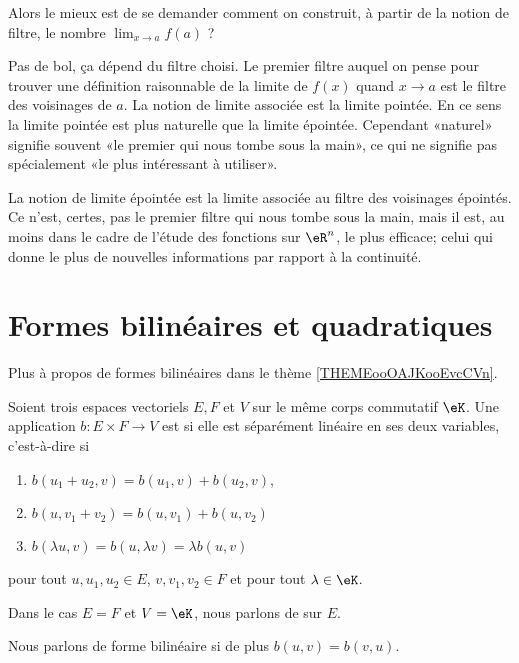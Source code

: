 Alors le mieux est de se demander comment on construit, à partir de la notion de filtre, le nombre \( \lim_{x\to a} f(a)\) ?

Pas de bol, ça dépend du filtre choisi. Le premier filtre auquel on pense pour trouver une définition raisonnable de la limite de \( f(x)\) quand \( x\to a\) est le filtre des voisinages de \( a\). La notion de limite associée est la limite pointée. En ce sens la limite pointée est plus naturelle que la limite épointée. Cependant «naturel» signifie souvent «le premier qui nous tombe sous la main», ce qui ne signifie pas spécialement «le plus intéressant à utiliser».

La notion de limite épointée est la limite associée au filtre des voisinages épointés. Ce n'est, certes, pas le premier filtre qui nous tombe sous la main, mais il est, au moins dans le cadre de l'étude des fonctions sur \( \eR^n\), le plus efficace; celui qui donne le plus de nouvelles informations par rapport à la continuité.

\section{Formes bilinéaires et quadratiques}

Plus à propos de formes bilinéaires dans le thème \ref{THEMEooOAJKooEvcCVn}.

\begin{definition}      \label{DEFooEEQGooNiPjHz}
    Soient trois espaces vectoriels \( E,F\) et \( V\) sur le même corps commutatif \( \eK\). Une application \( b\colon E\times F\to V\) est  si elle est séparément linéaire en ses deux variables, c'est-à-dire si
    \begin{enumerate}
        \item 
            \( b(u_1+u_2,v)=b(u_1,v)+b(u_2,v)\),
        \item
            \( b(u,v_1+v_2)=b(u,v_1)+b(u,v_2)\)
        \item
            \( b(\lambda u,v)=b(u,\lambda v)=\lambda b(u,v)\)
    \end{enumerate}
    pour tout \( u,u_1,u_2\in E\), \( v,v_1,v_2\in F\) et pour tout \( \lambda\in \eK\).

    Dans le cas \( E=F\) et \( V=\eK\), nous parlons de  sur \( E\).

    Nous parlons de forme bilinéaire  si de plus \( b(u,v)=b(v,u)\).
\end{definition}

